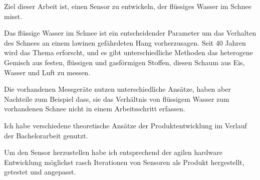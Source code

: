 Ziel dieser Arbeit ist, einen Sensor zu entwickeln, der flüssiges Wasser im Schnee misst.

Das flüssige Wasser im Schnee ist ein entscheidender Parameter um das Verhalten des Schnees an einem lawinen gefährdeten Hang  vorherzusagen. Seit 40 Jahren wird das Thema erforscht,  und es gibt unterschiedliche Methoden das heterogene Gemisch aus festen, flüssigen und gasförmigen Stoffen, diesen Schaum aus Eis, Wasser und Luft zu messen.

Die vorhandenen Messgeräte nutzen unterschiedliche Ansätze, haben aber Nachteile zum Beispiel dass, sie das Verhältnis von flüssigem Wasser zum vorhandenen Schnee nicht in einem Arbeitsschritt erfassen.

Ich habe verschiedene theoretische Ansätze der Produktentwicklung im Verlauf der Bachelorarbeit genutzt.

Um den Sensor herzustellen habe ich entsprechend der agilen hardware Entwicklung möglichst rasch Iterationen von Sensoren als Produkt hergestellt, getestet und angepasst.

\iffalse
ziel dieser Arbeit ist die entwicklung eines innovativen sensors um die scheefeuchtigkeit zu messen.

Die schneefeuchtigkeit ist ein entscheidenen Parameter um Gleitschneelawinen abzuschetzten. seit 40 jahren ist wird Thema beforscht. Es gibt verschiedenste Techniken um den Schaum aus Eis, Wasser und Luft zu messen. heutige Produkte konnen den LWC messen, haben aber verschiedene schwerwigeende nachteile.

um dieses Produktentwicklung an zu gehen werden verschiedene techniken der Produktentwicklung eingesetzt. um ein sensor zu erreichen der einsatztfahig ist, wurde nach aglier hardware entwicklung moglichst schnell Itterationen von sensoren entwickelt.

\fi
